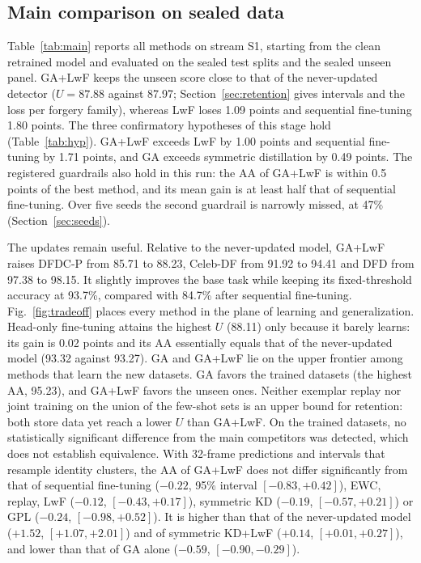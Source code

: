 \documentclass[journal]{IEEEtran}
\begin{document}
\subsection{Main comparison on sealed data}
Table~\ref{tab:main} reports all methods on stream S1, starting from the clean retrained model and evaluated on the sealed test splits and the sealed unseen panel. GA+LwF keeps the unseen score close to that of the never-updated detector ($U=87.88$ against 87.97; Section~\ref{sec:retention} gives intervals and the loss per forgery family), whereas LwF loses 1.09 points and sequential fine-tuning 1.80 points. The three confirmatory hypotheses of this stage hold (Table~\ref{tab:hyp}). GA+LwF exceeds LwF by 1.00 points and sequential fine-tuning by 1.71 points, and GA exceeds symmetric distillation by 0.49 points. The registered guardrails also hold in this run: the AA of GA+LwF is within 0.5 points of the best method, and its mean gain is at least half that of sequential fine-tuning. Over five seeds the second guardrail is narrowly missed, at 47\% (Section~\ref{sec:seeds}).

The updates remain useful. Relative to the never-updated model, GA+LwF raises DFDC-P from 85.71 to 88.23, Celeb-DF from 91.92 to 94.41 and DFD from 97.38 to 98.15. It slightly improves the base task while keeping its fixed-threshold accuracy at 93.7\%, compared with 84.7\% after sequential fine-tuning. Fig.~\ref{fig:tradeoff} places every method in the plane of learning and generalization. Head-only fine-tuning attains the highest $U$ (88.11) only because it barely learns: its gain is 0.02 points and its AA essentially equals that of the never-updated model (93.32 against 93.27). GA and GA+LwF lie on the upper frontier among methods that learn the new datasets. GA favors the trained datasets (the highest AA, 95.23), and GA+LwF favors the unseen ones. Neither exemplar replay nor joint training on the union of the few-shot sets is an upper bound for retention: both store data yet reach a lower $U$ than GA+LwF. On the trained datasets, no statistically significant difference from the main competitors was detected, which does not establish equivalence. With 32-frame predictions and intervals that resample identity clusters, the AA of GA+LwF does not differ significantly from that of sequential fine-tuning ($-0.22$, 95\% interval $[-0.83,+0.42]$), EWC, replay, LwF ($-0.12$, $[-0.43,+0.17]$), symmetric KD ($-0.19$, $[-0.57,+0.21]$) or GPL ($-0.24$, $[-0.98,+0.52]$). It is higher than that of the never-updated model ($+1.52$, $[+1.07,+2.01]$) and of symmetric KD+LwF ($+0.14$, $[+0.01,+0.27]$), and lower than that of GA alone ($-0.59$, $[-0.90,-0.29]$).
\end{document}
